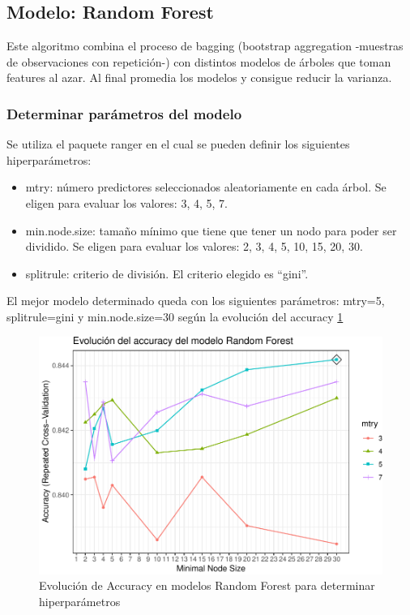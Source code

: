 \subsection{Modelo: Random Forest}

Este algoritmo combina el proceso de bagging (bootstrap aggregation
-muestras de observaciones con repetición-) con distintos modelos de
árboles que toman features al azar. Al final promedia los modelos y
consigue reducir la varianza.


\subsubsection{Determinar parámetros del modelo}

Se utiliza el paquete ranger en el cual se pueden definir los siguientes
hiperparámetros:

\begin{itemize}
	\item
	mtry: número predictores seleccionados aleatoriamente en cada árbol.
	Se eligen para evaluar los valores: 3, 4, 5, 7.
	\item
	min.node.size: tamaño mínimo que tiene que tener un nodo para poder
	ser dividido. Se eligen para evaluar los valores: 2, 3, 4, 5, 10, 15,
	20, 30.
	\item
	splitrule: criterio de división. El criterio elegido es ``gini''.
\end{itemize}

El mejor modelo determinado queda con los siguientes parámetros: mtry=5,
splitrule=gini y
 min.node.size=30 según la evolución del accuracy \ref{fig:rf_hiperparam}


\begin{figure}[!htb]
	\centering
	\includegraphics{imagenes/modelos_varios/unnamed-chunk-24-1.pdf}
	\caption{Evolución de Accuracy en modelos Random Forest para determinar hiperparámetros}
	\label{fig:rf_hiperparam}
\end{figure}



